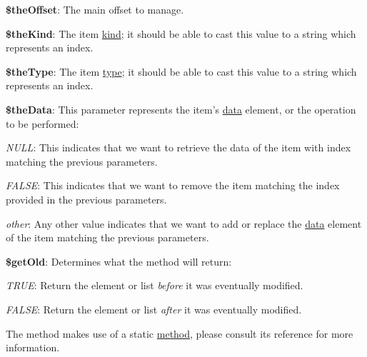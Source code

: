 \begin{DoxyItemize}
\item {\bfseries \$the\-Offset}\-: The main offset to manage. 
\item {\bfseries \$the\-Kind}\-: The item \hyperlink{}{kind}; it should be able to cast this value to a string which represents an index. 
\item {\bfseries \$the\-Type}\-: The item \hyperlink{}{type}; it should be able to cast this value to a string which represents an index. 
\item {\bfseries \$the\-Data}\-: This parameter represents the item's \hyperlink{}{data} element, or the operation to be performed\-: 
\begin{DoxyItemize}
\item {\itshape N\-U\-L\-L}\-: This indicates that we want to retrieve the data of the item with index matching the previous parameters. 
\item {\itshape F\-A\-L\-S\-E}\-: This indicates that we want to remove the item matching the index provided in the previous parameters. 
\item {\itshape other}\-: Any other value indicates that we want to add or replace the \hyperlink{}{data} element of the item matching the previous parameters. 
\end{DoxyItemize}
\item {\bfseries \$get\-Old}\-: Determines what the method will return\-: 
\begin{DoxyItemize}
\item {\itshape T\-R\-U\-E}\-: Return the element or list {\itshape before} it was eventually modified. 
\item {\itshape F\-A\-L\-S\-E}\-: Return the element or list {\itshape after} it was eventually modified. 
\end{DoxyItemize}
\end{DoxyItemize}

The method makes use of a static \hyperlink{class_c_attribute_ab0b7e532b3e0b4dca8fbab9b522e5332}{method}, please consult its reference for more information.


